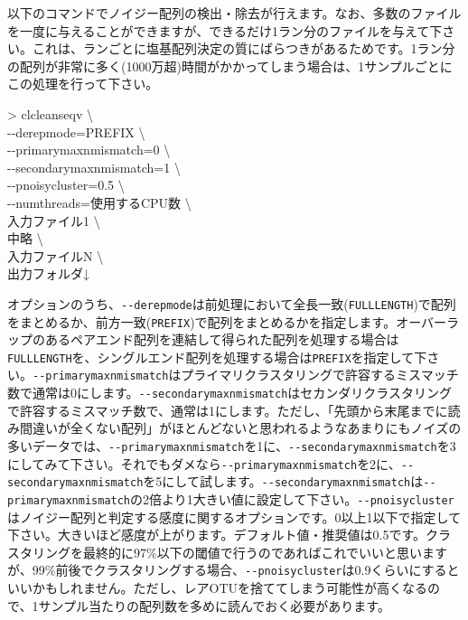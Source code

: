 \documentclass[titlepage,10pt,a4paper]{jsbook}
\newenvironment{cmd}{\begin{oframed}\raggedright\ttfamily\footnotesize\setlength{\baselineskip}{1.4em}}{\end{oframed}\vspace{-1em}}
\begin{document}
以下のコマンドでノイジー配列の検出・除去が行えます。なお、多数のファイルを一度に与えることができますが、できるだけ1ラン分のファイルを与えて下さい。これは、ランごとに塩基配列決定の質にばらつきがあるためです。1ラン分の配列が非常に多く(1000万超)時間がかかってしまう場合は、1サンプルごとにこの処理を行って下さい。
\begin{cmd}
{\textgreater} clcleanseqv {\textbackslash}\\
{-}{-}derepmode=PREFIX {\textbackslash}\\
{-}{-}primarymaxnmismatch=0 {\textbackslash}\\
{-}{-}secondarymaxnmismatch=1 {\textbackslash}\\
{-}{-}pnoisycluster=0.5 {\textbackslash}\\
{-}{-}numthreads=使用するCPU数 {\textbackslash}\\
入力ファイル1 {\textbackslash}\\
中略 {\textbackslash}\\
入力ファイルN {\textbackslash}\\
出力フォルダ↓
\end{cmd}
オプションのうち、\texttt{{-}{-}derepmode}は前処理において全長一致(\texttt{FULLLENGTH})で配列をまとめるか、前方一致(\texttt{PREFIX})で配列をまとめるかを指定します。オーバーラップのあるペアエンド配列を連結して得られた配列を処理する場合は\texttt{FULLLENGTH}を、シングルエンド配列を処理する場合は\texttt{PREFIX}を指定して下さい。\texttt{{-}{-}primarymaxnmismatch}はプライマリクラスタリングで許容するミスマッチ数で通常は0にします。\texttt{{-}{-}secondarymaxnmismatch}はセカンダリクラスタリングで許容するミスマッチ数で、通常は1にします。ただし、「先頭から末尾までに読み間違いが全くない配列」がほとんどないと思われるようなあまりにもノイズの多いデータでは、\texttt{{-}{-}primarymaxnmismatch}を1に、\texttt{{-}{-}secondarymaxnmismatch}を3にしてみて下さい。それでもダメなら\texttt{{-}{-}primarymaxnmismatch}を2に、\texttt{{-}{-}secondarymaxnmismatch}を5にして試します。\texttt{{-}{-}secondarymaxnmismatch}は\texttt{{-}{-}primarymaxnmismatch}の2倍より1大きい値に設定して下さい。\texttt{{-}{-}pnoisycluster}はノイジー配列と判定する感度に関するオプションです。0以上1以下で指定して下さい。大きいほど感度が上がります。デフォルト値・推奨値は0.5です。クラスタリングを最終的に97\%以下の閾値で行うのであればこれでいいと思いますが、99\%前後でクラスタリングする場合、\texttt{{-}{-}pnoisycluster}は0.9くらいにするといいかもしれません。ただし、レアOTUを捨ててしまう可能性が高くなるので、1サンプル当たりの配列数を多めに読んでおく必要があります。
\end{document}
